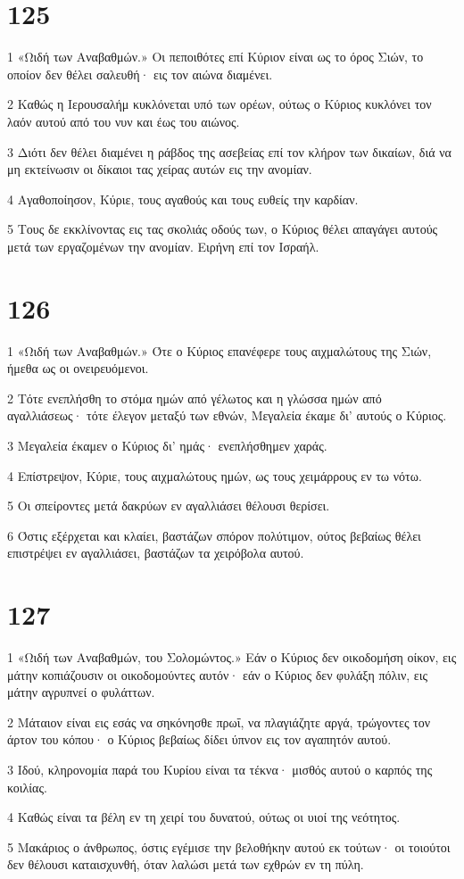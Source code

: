 \chapter{125}

\par 1 «Ωιδή των Αναβαθμών.» Οι πεποιθότες επί Κύριον είναι ως το όρος Σιών, το οποίον δεν θέλει σαλευθή· εις τον αιώνα διαμένει.
\par 2 Καθώς η Ιερουσαλήμ κυκλόνεται υπό των ορέων, ούτως ο Κύριος κυκλόνει τον λαόν αυτού από του νυν και έως του αιώνος.
\par 3 Διότι δεν θέλει διαμένει η ράβδος της ασεβείας επί τον κλήρον των δικαίων, διά να μη εκτείνωσιν οι δίκαιοι τας χείρας αυτών εις την ανομίαν.
\par 4 Αγαθοποίησον, Κύριε, τους αγαθούς και τους ευθείς την καρδίαν.
\par 5 Τους δε εκκλίνοντας εις τας σκολιάς οδούς των, ο Κύριος θέλει απαγάγει αυτούς μετά των εργαζομένων την ανομίαν. Ειρήνη επί τον Ισραήλ.

\chapter{126}

\par 1 «Ωιδή των Αναβαθμών.» Ότε ο Κύριος επανέφερε τους αιχμαλώτους της Σιών, ήμεθα ως οι ονειρευόμενοι.
\par 2 Τότε ενεπλήσθη το στόμα ημών από γέλωτος και η γλώσσα ημών από αγαλλιάσεως· τότε έλεγον μεταξύ των εθνών, Μεγαλεία έκαμε δι' αυτούς ο Κύριος.
\par 3 Μεγαλεία έκαμεν ο Κύριος δι' ημάς· ενεπλήσθημεν χαράς.
\par 4 Επίστρεψον, Κύριε, τους αιχμαλώτους ημών, ως τους χειμάρρους εν τω νότω.
\par 5 Οι σπείροντες μετά δακρύων εν αγαλλιάσει θέλουσι θερίσει.
\par 6 Όστις εξέρχεται και κλαίει, βαστάζων σπόρον πολύτιμον, ούτος βεβαίως θέλει επιστρέψει εν αγαλλιάσει, βαστάζων τα χειρόβολα αυτού.

\chapter{127}

\par 1 «Ωιδή των Αναβαθμών, του Σολομώντος.» Εάν ο Κύριος δεν οικοδομήση οίκον, εις μάτην κοπιάζουσιν οι οικοδομούντες αυτόν· εάν ο Κύριος δεν φυλάξη πόλιν, εις μάτην αγρυπνεί ο φυλάττων.
\par 2 Μάταιον είναι εις εσάς να σηκόνησθε πρωΐ, να πλαγιάζητε αργά, τρώγοντες τον άρτον του κόπου· ο Κύριος βεβαίως δίδει ύπνον εις τον αγαπητόν αυτού.
\par 3 Ιδού, κληρονομία παρά του Κυρίου είναι τα τέκνα· μισθός αυτού ο καρπός της κοιλίας.
\par 4 Καθώς είναι τα βέλη εν τη χειρί του δυνατού, ούτως οι υιοί της νεότητος.
\par 5 Μακάριος ο άνθρωπος, όστις εγέμισε την βελοθήκην αυτού εκ τούτων· οι τοιούτοι δεν θέλουσι καταισχυνθή, όταν λαλώσι μετά των εχθρών εν τη πύλη.


